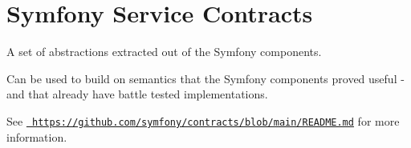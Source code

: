 \chapter{Symfony Service Contracts}
\hypertarget{md_public_2glpi_2vendor_2symfony_2service-contracts_2_r_e_a_d_m_e}{}\label{md_public_2glpi_2vendor_2symfony_2service-contracts_2_r_e_a_d_m_e}
A set of abstractions extracted out of the Symfony components.

Can be used to build on semantics that the Symfony components proved useful -\/ and that already have battle tested implementations.

See \href{https://github.com/symfony/contracts/blob/main/README.md}{\texttt{ https\+://github.\+com/symfony/contracts/blob/main/\+README.\+md}} for more information. 